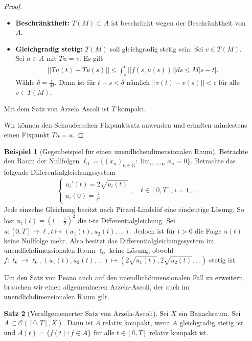 \documentclass[a4paper]{article}
\theoremstyle{definition}
\newtheorem{theorem}{Satz}
\newtheorem{example}[theorem]{Beispiel}
\begin{document}
\begin{proof}
\begin{itemize}
    \begin{itemize}
        \item \textbf{Beschränktheit:} $T(M) \subset A$ ist beschränkt wegen der Beschränktheit von $A$.
        \item \textbf{Gleichgradig stetig:} $T(M)$ soll gleichgradig stetig sein. Sei $v \in T(M)$. Sei $u \in A$ mit $Tu = v$. Es gilt 
        \begin{align*}
            ||Tu(t) - Tu(s)|| \leq \int^t_{s} ||f(s,u(s))|| ds \leq M |s-t|.
        \end{align*}
        Wähle $\delta = \frac{\epsilon}{M}$. Dann ist für $t-s < \delta$ nämlich $||v(t) - v(s)|| < \epsilon$ für alle $v \in T(M)$.
    \end{itemize}
    Mit dem Satz von Arzela Ascoli ist $T$ kompakt.
\end{itemize}

Wir können den Schauderschen Fixpunktsatz anwenden und erhalten mindestens einen Fixpunkt $Tu = u$.
\end{proof}

\begin{example}[Gegenbeispiel für einen unendlichendimensionalen Raum]
Betrachte den Raum der Nullfolgen $\ell_0 = \{ (x_n)_{n \in \mathbb{N}} : \lim_{n \to \infty} x_n = 0 \}$. Betrachte das folgende Differentialgleichungssystem 
\begin{align*}
    \begin{cases}
        u_i'(t) = 2 \sqrt{u_i(t)} \\
        u_i(0) = \frac{1}{i^2}
    \end{cases}, \quad t \in [0,T], i=1,...
\end{align*}
Jede einzelne Gleichung besitzt nach Picard-Lindelöf eine eindeutige Lösung. So löst $u_i(t) = (t+\frac{i}{2})^2$ die i-te Differentialgleichung. Sei $u: [0,T] \to \ell, t \mapsto (u_1(t),u_2(t),...)$. Jedoch ist für $t > 0$ die Folge $u(t)$ keine Nullfolge mehr. Also besitzt das Differentialgleichungssystem im unendlichdimensionalen Raum $\ell_0$ keine Lösung, obwohl $f: \ell_0 \to \ell_0, (u_1(t),u_2(t),...) \mapsto (2\sqrt{u_1(t)},2\sqrt{u_2(t)},...)$ stetig ist.
\end{example}

Um den Satz von Peano auch auf den unendlichdimensionalen Fall zu erweitern, brauchen wir einen allgemenineren Arzela-Ascoli, der auch im unendlichdimensionalen Raum gilt.

\begin{theorem}[Verallgemeinerter Satz von Arzela-Ascoli]
Sei $X$ ein Banachraum. Sei $A \subset \mathcal{C}([0,T], X)$. Dann ist $A$ relativ kompakt, wenn $A$ gleichgradig stetig ist und $A(t) = \{ f(t) : f \in A \}$ für alle $t \in [0,T]$ relativ kompakt ist.
\end{theorem}
\end{document}
